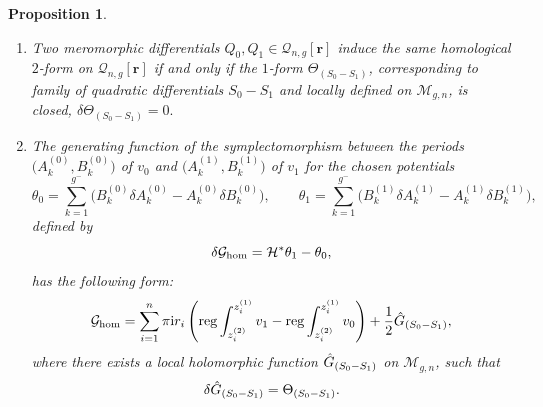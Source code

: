 \documentclass[pdftex]{sigma}
\numberwithin{equation}{section}
\newtheorem{Proposition}[Theorem]{Proposition}
\theoremstyle{definition}
\begin{document}
\begin{Proposition} \label{Prop_3}\quad
\begin{enumerate}\itemsep=0pt
\item[$1.$] Two meromorphic differentials $Q_0, Q_1 \in \mathcal{Q}_{n,g}[\textbf{r}]$ induce the same homological $2$-form on $\mathcal{Q}_{n,g}[\textbf{r}]$ if and only if the $1$-form $\Theta_{(S_0-S_1)}$, corresponding to family of quadratic differentials $S_0-S_1$ and locally defined on $\mathcal{M}_{g,n}$,
is closed, $\delta\Theta_{(S_0-S_1)}=0.$

\item[$2.$] The generating function of the symplectomorphism between the periods $\big(A^{(0)}_k,B^{(0)}_k\big)$ of $v_0$ and $\big(A^{(1)}_k,B^{(1)}_k\big)$ of $v_1$ for the chosen potentials \begin{equation}\label{69}\theta_0=\sum^{g^-}_{k=1}\big(B^{(0)}_k \delta A^{(0)}_k - A^{(0)}_k \delta B^{(0)}_k\big), \qquad \theta_1=\sum^{g^-}_{k=1}\big(B^{(1)}_k \delta A^{(1)}_k - A^{(1)}_k \delta B^{(1)}_k\big),\end{equation}
defined by
\begin{equation*}%
\delta\mathcal{G}_{{\rm hom}}=\mathcal{H}^*\theta_1 - \theta_0 ,
\end{equation*}
has the following form:
\begin{equation}\label{71}
\mathcal{G}_{{\rm hom}}=\sum^n_{i=1}\pi {\rm i} r_i\left({\rm reg}\int^{z^{(1)}_i}_{z^{(2)}_i}v_1 -{\rm reg}\int^{z^{(1)}_i}_{z^{(2)}_i}v_0 \right)+\frac{1}{2}\Hat{G}_{(S_0 -S_1)},
\end{equation}
where there exists a local holomorphic function $\Hat{G}_{(S_0 -S_1)}$ on $\mathcal{M}_{g,n}$, such that
\begin{equation*}%
\delta\Hat{G}_{(S_0 -S_1)}= \Theta_{(S_0-S_1)}.
\end{equation*}
\end{enumerate}
\end{Proposition}
\end{document}
